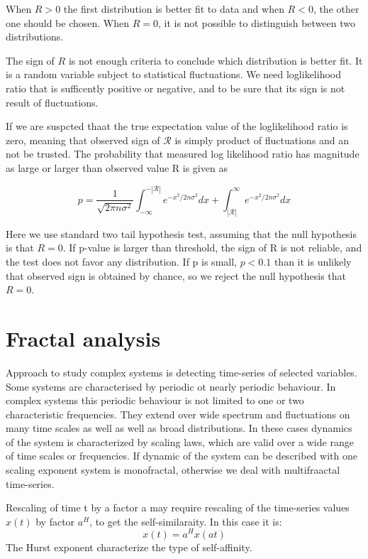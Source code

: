 When $R>0$ the first distribution is better fit to data and when $R<0$, the other one should be chosen. When $R=0$, it is not possible to distinguish between two distributions. 

The sign of $R$ is not enough criteria to conclude which distribution is better fit. It is a random variable subject to statistical fluctuations. We need loglikelihood ratio that is sufficently positive or negative, and to be sure that its sign is not result of fluctuations.

If we are suspcted thaat the true expectation value of the loglikelihood ratio is zero, meaning that observed sign of $\mathcal{R}$ is simply product of fluctuations and an not be trusted. The probability that measured log likelihood ratio has magnitude as large or larger than observed value R is given as

\begin{equation}
p = \frac{1}{\sqrt{2\pi n \sigma^2}} \int_{-\infty}^{-|\mathcal{R}|}e^{-x^2/2n\sigma^2}dx + \int_{|\mathcal{R}|}^{\infty}e^{-x^2/2n\sigma^2}dx
\end{equation}

Here we use standard two tail hypothesis test, assuming that the null hypothesis is that $R= 0$. If p-value is larger than threshold, the sign of R is not reliable, and the test does not favor any distribution. If p is small, $p<0.1$ than it is unlikely that observed sign is obtained by chance, so we reject the null hypothesis that $R=0$. 



\section{Fractal analysis}

Approach to study complex systems is detecting time-series of selected variables. Some systems are characterised by periodic ot nearly periodic behaviour. In complex systems this periodic behaviour is not limited to one or two characteristic frequencies. They extend over wide spectrum and fluctuations on many time scales as well as well as broad distributions. In these cases dynamics of the system is characterized by scaling laws, which are valid over a wide range of time scales or frequencies. If dynamic of the system can be described with one scaling exponent system is monofractal, otherwise we deal with multifraactal time-series.

Rescaling of time t by a factor a may require rescaling of the time-series values $x(t)$ by factor $a^H$, to get the self-similaraity. In this case it is:
$$x(t) = a^Hx(at)$$
The Hurst exponent characterize the type of self-affinity. 

